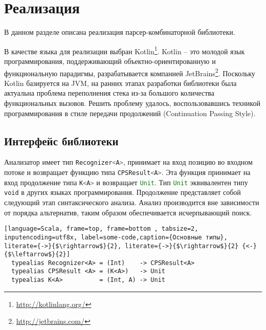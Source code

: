 \section{Реализация}

В данном разделе описана реализация парсер-комбинаторной библиотеки.

В качестве языка для реализации выбран Kotlin\footnote{\url{http://kotlinlang.org/}}. Kotlin -- это молодой язык программирования, поддерживающий объектно-ориентированную и функциональную парадигмы, разрабатывается компанией JetBrains\footnote{\url{http://jetbrains.com/}}. Поскольку Kotlin базируется на JVM, на ранних этапах разработки библиотеки была актуальна проблема переполнения стека из-за большого количества функциональных вызовов. Решить проблему удалось, воспользовавшись техникой программирования в стиле передачи продолжений (Continuation Passing Style).
  
    \subsection{Интерфейс библиотеки}
  
Анализатор имеет тип \lstinline[language=Scala]{Recognizer<A>}, принимает на вход позицию во входном потоке и возвращает функцию типа \lstinline[language=Scala]{CPSResult<A>}. Эта функция принимает на вход продолжение типа \lstinline[language=Scala]{K<A>} и возвращает \lstinline[language=Scala]{Unit}. Тип \lstinline[language=Scala]{Unit} эквивалентен типу {\tt void} в других языках программирования. Продолжение представляет собой следующий этап синтаксического анализа. Анализ производится вне зависимости от порядка
    альтернатив, таким образом обеспечивается исчерпывающий поиск. 
    
  \begin{lstlisting}[language=Scala, frame=top, frame=bottom , tabsize=2, inputencoding=utf8x, label=some-code,caption={Основные типы}, literate={->}{$\rightarrow$}{2}, literate={->}{$\rightarrow$}{2} {<-}{$\leftarrow$}{2}]
  typealias Recognizer<A> = (Int)    -> CPSResult<A> 
  typealias CPSResult <A> = (K<A>)   -> Unit
  typealias K<A>          = (Int, A) -> Unit
  \end{lstlisting}
  
